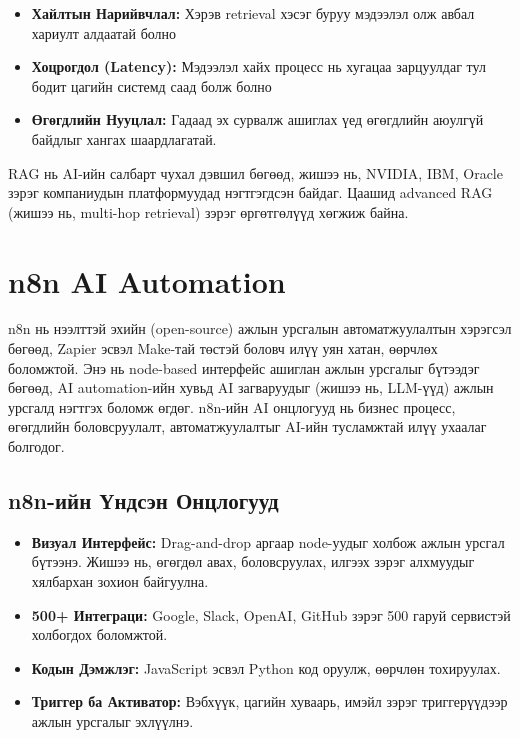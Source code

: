 \documentclass[12pt,A4]{report}
\begin{document}
\begin{itemize}
    \item \textbf{Хайлтын Нарийвчлал:} Хэрэв retrieval хэсэг буруу мэдээлэл олж авбал хариулт алдаатай болно
    \item \textbf{Хоцрогдол (Latency):} Мэдээлэл хайх процесс нь хугацаа зарцуулдаг тул бодит цагийн системд саад болж болно
    \item \textbf{Өгөгдлийн Нууцлал:} Гадаад эх сурвалж ашиглах үед өгөгдлийн аюулгүй байдлыг хангах шаардлагатай. \cite{rag5}
\end{itemize}

RAG нь AI-ийн салбарт чухал дэвшил бөгөөд, жишээ нь, NVIDIA, IBM, Oracle зэрэг компаниудын платформуудад нэгтгэгдсэн байдаг.\cite{rag?} Цаашид advanced RAG (жишээ нь, multi-hop retrieval) зэрэг өргөтгөлүүд хөгжиж байна.

\section{n8n AI Automation}

n8n нь нээлттэй эхийн (open-source) ажлын урсгалын автоматжуулалтын хэрэгсэл бөгөөд, Zapier эсвэл Make-тай төстэй боловч илүү уян хатан, өөрчлөх боломжтой. Энэ нь node-based интерфейс ашиглан ажлын урсгалыг бүтээдэг бөгөөд, AI automation-ийн хувьд AI загваруудыг (жишээ нь, LLM-үүд) ажлын урсгалд нэгтгэх боломж өгдөг. n8n-ийн AI онцлогууд нь бизнес процесс, өгөгдлийн боловсруулалт, автоматжуулалтыг AI-ийн тусламжтай илүү ухаалаг болгодог.\cite{n8n?}

\subsection{n8n-ийн Үндсэн Онцлогууд}

\begin{itemize}
    \item \textbf{Визуал Интерфейс:} Drag-and-drop аргаар node-уудыг холбож ажлын урсгал бүтээнэ. Жишээ нь, өгөгдөл авах, боловсруулах, илгээх зэрэг алхмуудыг хялбархан зохион байгуулна. \cite{n8n1}
    \item \textbf{500+ Интеграци:} Google, Slack, OpenAI, GitHub зэрэг 500 гаруй сервистэй холбогдох боломжтой.
    \item \textbf{Кодын Дэмжлэг:} JavaScript эсвэл Python код оруулж, өөрчлөн тохируулах.
    \item \textbf{Триггер ба Активатор:} Вэбхүүк, цагийн хуваарь, имэйл зэрэг триггерүүдээр ажлын урсгалыг эхлүүлнэ. \cite{n8n?}
\end{itemize}
\end{document}
